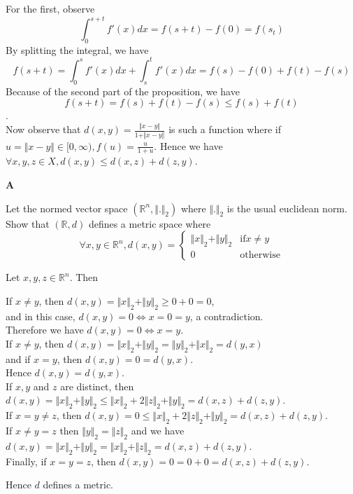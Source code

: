 \documentclass[12pt,a4paper]{article}
\begin{document}
	For the first, observe\\
	\[
	\int_0^{s+t} f'(x) dx = f(s+t) - f(0) = f(s_t)
	\]
	By splitting the integral, we have
	\[
	f(s+t) = \int_0^s f'(x)dx + \int_s^t f'(x)dx = f(s) - f(0) + f(t) -f(s)
	\]
	Because of the second part of the proposition, we have
	$$f(s+t) = f(s) + f(t) - f(s) \leq f(s) + f(t)$$.\\
	
	
	Now observe that $d(x,y) = \frac{\Vert x - y \Vert}{1 + \Vert x - y \Vert}$ is such a function where if $u = \Vert x - y \Vert \in [0, \infty), f(u) = \frac{u}{1 + u}$. Hence we have\\
	$\forall x,y,z \in X, d(x,y) \leq d(x,z) + d(z,y)$.
	
\pagebreak
\textbf{A}
\begin{ques}
	Let the normed vector space $(\mathbb{R}^n, \Vert . \Vert_2)$ where $\Vert . \Vert_2$ is the usual euclidean norm. Show that $(\mathbb{R}, d)$ defines a metric space where 
	$$\forall x,y \in \mathbb{R}^n, d(x,y) = \begin{cases} \Vert x\Vert_2 + \Vert y \Vert_2 & \text{if} x \neq y \\ 0 & \text{otherwise}
	\end{cases}$$
\end{ques}
	
	Let $x,y,z \in \mathbb{R}^n$. Then
	
	If $x \neq y$, then $d(x,y) = \Vert x \Vert_2 + \Vert y \Vert_2 \geq 0 + 0 = 0$,\\
	and in this case, $d(x,y) = 0 \Longleftrightarrow x = 0 = y$, a contradiction. \\
	Therefore we have $d(x,y) = 0 \Longleftrightarrow x = y$.\\
	
	If $x \neq y$, then $d(x,y) = \Vert x \Vert_2 + \Vert y \Vert_2 = \Vert y \Vert_2 + \Vert x \Vert_2 = d(y,x)$\\
	and if $x = y$, then $d(x,y) = 0 = d(y,x)$.\\
	Hence $d(x,y) = d(y,x)$.\\
	
	If $x,y$ and $z$ are distinct, then $d(x,y) = \Vert x \Vert_2 + \Vert y \Vert_2 \leq \Vert x \Vert_2 + 2 \Vert z \Vert_2 + \Vert y \Vert_2 = d(x,z) + d(z,y)$.\\
	If $x = y \neq z$, then $d(x,y) = 0 \le \Vert x \Vert_2 + 2 \Vert z \Vert_2 + \Vert y \Vert_2 = d(x,z) + d(z,y)$.\\
	If $x \neq y = z$ then $\Vert y \Vert_2 = \Vert z \Vert_2$ and we have $d(x,y) = \Vert x \Vert_2 + \Vert y \Vert_2 = \Vert x \Vert_2 + \Vert z \Vert_2 = d(x,z) + d(z,y)$.\\
	Finally, if $x = y = z$, then $d(x,y) = 0 = 0 + 0 = d(x,z) + d(z,y).$
	
	Hence $d$ defines a metric.
	
	
\end{document}
